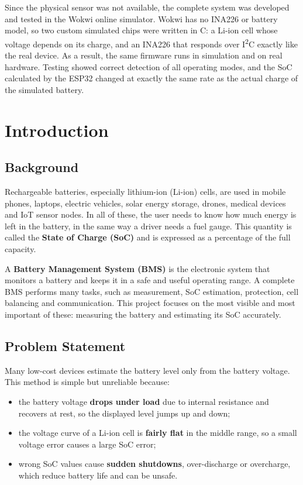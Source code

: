 \documentclass[12pt,a4paper,oneside]{report}
\begin{document}
Since the physical sensor was not available, the complete system was developed and tested in the Wokwi online simulator. Wokwi has no INA226 or battery model, so two custom simulated chips were written in C: a Li-ion cell whose voltage depends on its charge, and an INA226 that responds over I\textsuperscript{2}C exactly like the real device. As a result, the same firmware runs in simulation and on real hardware. Testing showed correct detection of all operating modes, and the SoC calculated by the ESP32 changed at exactly the same rate as the actual charge of the simulated battery.

\tableofcontents
\listoffigures
\listoftables

\clearpage
{}

\chapter{Introduction}

\section{Background}
Rechargeable batteries, especially lithium-ion (Li-ion) cells, are used in mobile phones, laptops, electric vehicles, solar energy storage, drones, medical devices and IoT sensor nodes. In all of these, the user needs to know how much energy is left in the battery, in the same way a driver needs a fuel gauge. This quantity is called the \textbf{State of Charge (SoC)} and is expressed as a percentage of the full capacity.

A \textbf{Battery Management System (BMS)} is the electronic system that monitors a battery and keeps it in a safe and useful operating range. A complete BMS performs many tasks, such as measurement, SoC estimation, protection, cell balancing and communication. This project focuses on the most visible and most important of these: measuring the battery and estimating its SoC accurately.

\section{Problem Statement}
Many low-cost devices estimate the battery level only from the battery voltage. This method is simple but unreliable because:
\begin{itemize}
  \item the battery voltage \textbf{drops under load} due to internal resistance and recovers at rest, so the displayed level jumps up and down;
  \item the voltage curve of a Li-ion cell is \textbf{fairly flat} in the middle range, so a small voltage error causes a large SoC error;
  \item wrong SoC values cause \textbf{sudden shutdowns}, over-discharge or overcharge, which reduce battery life and can be unsafe.
\end{itemize}
\end{document}
